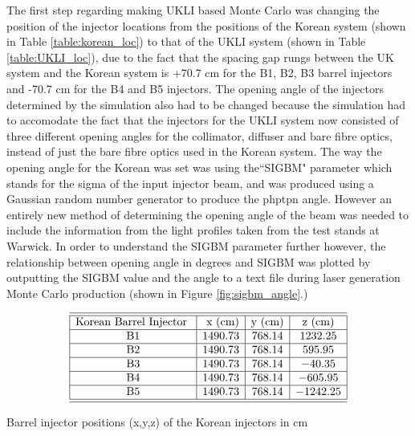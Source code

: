 The first step regarding making UKLI based Monte Carlo was changing the position of the injector locations from the positions of the Korean system (shown in Table \ref{table:korean_loc}) to that of the UKLI system (shown in Table \ref{table:UKLI_loc}), due to the fact that the spacing gap rungs between the UK system and the Korean system is +70.7 cm for the B1, B2, B3 barrel injectors and -70.7 cm for the B4 and B5 injectors. The opening angle of the injectors determined by the simulation also had to be changed because the simulation had to accomodate the fact that the injectors for the UKLI system now consisted of three different opening angles for the collimator, diffuser and bare fibre optics, instead of just the bare fibre optics used in the Korean system. The way the opening angle for the Korean was set was using the``SIGBM" parameter which stands for the sigma of the input injector beam, and was produced using a Gaussian random number generator to produce the phptpn angle. However an entirely new method of determining the opening angle of the beam was needed to include the information from the light profiles taken from the test stands at Warwick. In order to understand the SIGBM parameter further however, the relationship between opening angle in degrees and SIGBM was plotted by outputting the SIGBM value and the angle to a text file during laser generation Monte Carlo production (shown in Figure \ref{fig:sigbm_angle}.)

\begin{table}[htp]
    $$
\begin{array}{|c|c|c|c|c|c|}  
    \hline \hline{\text {Korean Barrel Injector }} & {\text { x (cm)}} & {\text {y (cm)}} & {\text {z (cm)}}  \tabularnewline
    \hline \text { B1 } & 1490.73 & 768.14 & 1232.25 \\
    \hline \text { B2 } & 1490.73 & 768.14 & 595.95 \\
    \hline \text { B3 } & 1490.73 & 768.14 & -40.35 \\
    \hline \text { B4 } & 1490.73 & 768.14 & -605.95 \\
    \hline \text { B5 } & 1490.73 & 768.14 &  -1242.25 \\
    \hline \hline 
\end{array}
    $$
\caption{Barrel injector positions (x,y,z) of the Korean injectors in cm} 
\label{table:korean_loc}
\end{table}

